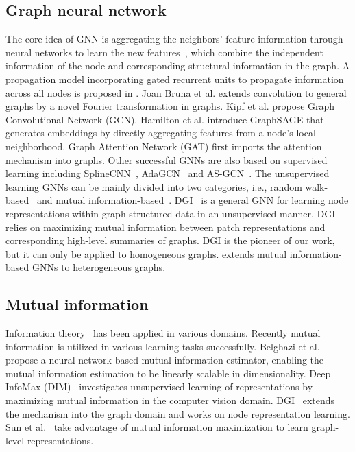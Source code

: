 \documentclass[conference]{IEEEtran}
\begin{document}
\subsection{Graph neural network} 
The core idea of GNN is aggregating the neighbors' feature information through neural networks to learn the new features~\cite{XHLJ10}, which combine the independent information of the node and corresponding structural information in the graph. A propagation model incorporating gated recurrent units to propagate information across all nodes is proposed in \cite{YDMR16}. Joan Bruna et al. \cite{JWAY13} extends convolution to general graphs by a novel Fourier transformation in graphs. Kipf et al. \cite{KW17} propose Graph Convolutional Network (GCN). Hamilton et al. \cite{HYL17} introduce GraphSAGE that generates embeddings by directly aggregating features from a node's local neighborhood. Graph Attention Network (GAT) \cite{VCCRLB18} first imports the attention mechanism into graphs. Other successful GNNs are also based on supervised learning including SplineCNN~\cite{fey2018splinecnn}, AdaGCN~\cite{sun2019adagcn} and AS-GCN~\cite{huang2018adaptive}. The unsupervised learning GNNs can be mainly divided into two categories, i.e., random walk-based~\cite{PAS14,GL16,KW16,DN17,HYL17} and mutual information-based~\cite{velivckovic2018deep}. DGI~\cite{velivckovic2018deep} is a general GNN for learning node representations within graph-structured data in an unsupervised manner. DGI relies on maximizing mutual information between patch representations and corresponding high-level summaries of graphs. DGI is the pioneer of our work, but it can only be applied to homogeneous graphs. {\our} extends mutual information-based GNNs to heterogeneous graphs.
\subsection{Mutual information} 
Information theory~\cite{shannon1948mathematical} has been applied in various domains. Recently mutual information is utilized in various learning tasks successfully. Belghazi et al.~\cite{BBROBCD18} propose a neural network-based mutual information estimator, enabling the mutual information estimation to be linearly scalable in dimensionality. Deep InfoMax (DIM)~\cite{HFMGBTB19} investigates unsupervised learning of representations by maximizing mutual information in the computer vision domain. DGI~\cite{velivckovic2018deep} extends the mechanism into the graph domain and works on node representation learning. Sun et al.~\cite{sun2019infograph} take advantage of mutual information maximization to learn graph-level representations.
\end{document}
